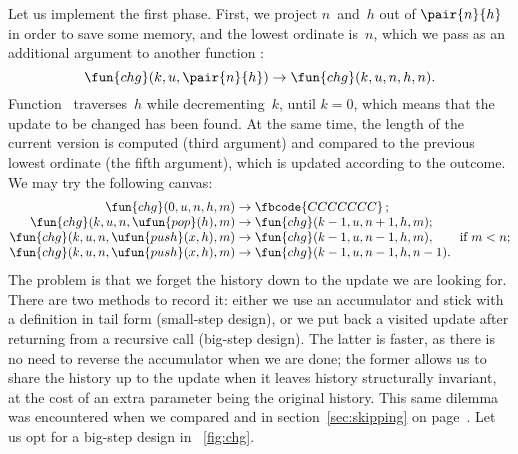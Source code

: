Let us implement the first phase. First, we project \(n\)~and~\(h\)
out of \(\pair{n}{h}\) in order to save some memory, and the lowest
ordinate is~\(n\), which we pass as an additional argument to another
function :
\begin{equation*}
\fun{chg}(k,u,\pair{n}{h}) \rightarrow \fun{chg}(k,u,n,h,n).
\end{equation*}
Function~ traverses~\(h\) while decrementing~\(k\), until
\(k=0\), which means that the update to be changed has been found. At
the same time, the length of the current version is computed (third
argument) and compared to the previous lowest ordinate (the fifth
argument), which is updated according to the outcome. We may try the
following canvas:
\begin{equation*}
\begin{array}{@{}r@{\;}l@{\;}l@{}}
\fun{chg}(0,u,n,h,m) & \rightarrow & \fbcode{CCCCCCC}\,;\\
\fun{chg}(k,u,n,\ufun{pop}(h),m) & \rightarrow
                                 & \fun{chg}(k-1,u,n+1,h,m);\\
\fun{chg}(k,u,n,\ufun{push}(x,h),m) & \rightarrow
                   & \fun{chg}(k-1,u,n-1,h,m),\qquad \text{if \(m < n\)};\\
\fun{chg}(k,u,n,\ufun{push}(x,h),m) & \rightarrow
                                    & \fun{chg}(k-1,u,n-1,h,n-1).
\end{array}
\end{equation*}
 The problem is that we forget the history
down to the update we are looking for. There are two methods to record
it: either we use an accumulator and stick with a definition in tail
form (small\hyp{}step
design), or we put back a visited
update after returning from a recursive call (big\hyp{}step
design). The latter is faster, as there
is no need to reverse the accumulator when we are done; the former
allows us to share the history up to the update when it leaves history
structurally invariant, at the cost of an extra parameter being the
original history. This same dilemma was encountered when we compared
 and
 in
section~\ref{sec:skipping} on page~\pageref{sec:skipping}. Let us opt
for a big\hyp{}step design in \fig~\ref{fig:chg}.

